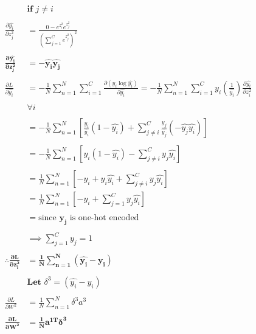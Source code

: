 \documentclass{article}
\begin{document}
	\begin{align*}
		&  \textbf{if }   j \neq i\\ \\
		\frac{\partial \hat{y_i}}{\partial z_j^{2}}& = \frac{0-e^{z_i^2}e^{z_j^2}}{(\sum_{j=1}^Ce^{z_j^2})^2} \\\\
		\boldsymbol{\frac{\partial \hat{y_i}}{\partial z_j^{2}}} & \boldsymbol{=-\hat{y_i}\hat{y_j}}
	\\
	\\
		\frac{\partial L}{\partial \hat{y_i}} &= -\frac{1}{N}\sum_{n=1}^N\sum_{i=1}^C\frac{\partial (y_i\log{\hat{y_i}})}{\partial \hat{y_i}} = -\frac{1}{N}\sum_{n=1}^N\sum_{i=1}^C y_i \left(\frac{1}{\hat{y_i}} \right) \frac{\partial \hat{y_i}}			  			{\partial z_i^2}\\ \\
		&  \forall i \\ \\
		&= -\frac{1}{N}\sum_{n=1}^N \left[  \frac{ y_i}{\hat{y_i}} \left(1-\hat{y_i} \right) + \sum_{j\neq i}^C \frac{y_j}{\hat{y_j}}  (-\hat{y_j}\hat{y_i}) \right]\\ \\
		&= -\frac{1}{N}\sum_{n=1}^N \left[ y_i(1-\hat{y_i}) - \sum_{j\neq i}^C y_j\hat{y_i} \right]\\ \\
		&= \frac{1}{N}\sum_{n=1}^N \left[ -y_i+y_i\hat{y_i} +  \sum_{j\neq i}^Cy_j\hat{y_i} \right]\\
		&= \frac{1}{N}\sum_{n=1}^N \left[ -y_i+ \sum_{j= 1}^Cy_j\hat{y_i} \right]\\ \\
		&= \text{since } \boldsymbol{y_j} \text{ is one-hot encoded}\\ \\
		&\implies \sum_{j=1}^Cy_j = 1\\ \\
		\boldsymbol{\therefore{} \frac{\partial L}{\partial z_i^2}} &= \boldsymbol{\frac{1}{N}\sum_{n=1}^N(\hat{y_i}-y_i)}
	\\
	\\
		& \textbf{Let } \delta^3 = (\hat{y_i}-y_i)\\ \\
		\frac{\partial L}{\partial W^2} &= \frac{1}{N}\sum_{n=1}^N\delta^3a^3\\\\
		\boldsymbol{\frac{\partial L}{\partial W^2}}& \boldsymbol{=\frac{1}{N}a^{1T}\delta^3} \\ \\
	\end{align*}
\end{document}
